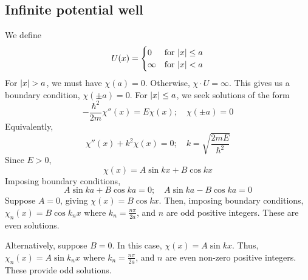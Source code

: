 \subsection{Infinite potential well}
We define
\[
	U(x) = \begin{cases}
		0      & \text{for } \abs{x} \leq a \\
		\infty & \text{for } \abs{x} < a
	\end{cases}
\]
For \( \abs{x} > a \), we must have \( \chi(a) = 0 \).
Otherwise, \( \chi \cdot U = \infty \).
This gives us a boundary condition, \( \chi(\pm a) = 0 \).
For \( \abs{x} \leq a \), we seek solutions of the form
\[
	-\frac{\hbar^2}{2m} \chi''(x) = E \chi(x);\quad \chi(\pm a) = 0
\]
Equivalently,
\[
	\chi''(x) + k^2 \chi(x) = 0;\quad k = \sqrt{\frac{2mE}{\hbar^2}}
\]
Since \( E > 0 \),
\[
	\chi(x) = A \sin kx + B \cos kx
\]
Imposing boundary conditions,
\[
	A \sin ka + B \cos ka = 0;\quad A \sin ka - B \cos ka = 0
\]
Suppose \( A = 0 \), giving \( \chi(x) = B \cos kx \).
Then, imposing boundary conditions, \( \chi_n(x) = B \cos k_n x \) where \( k_n = \frac{n \pi}{2a} \), and \( n \) are odd positive integers.
These are even solutions.

Alternatively, suppose \( B = 0 \).
In this case, \( \chi(x) = A \sin kx \).
Thus, \( \chi_n(x) = A \sin k_n x \) where \( k_n = \frac{n \pi}{2a} \), and \( n \) are even non-zero positive integers.
These provide odd solutions.


